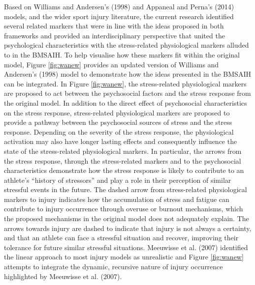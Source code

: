 \documentclass[
  english,
  man,floatsintext]{apa6}
\begin{document}
Based on Williams and Andersen's (1998) and Appaneal and Perna's (2014) models, and the wider sport injury literature, the current research identified several related markers that were in line with the ideas proposed in both frameworks and provided an interdisciplinary perspective that united the psychological characteristics with the stress-related physiological markers alluded to in the BMSAIH.
To help visualise how these markers fit within the original model, Figure \ref{fig:wanew} provides an updated version of Williams and Andersen's (1998) model to demonstrate how the ideas presented in the BMSAIH can be integrated.
In Figure \ref{fig:wanew}, the stress-related physiological markers are proposed to act between the psychosocial factors and the stress response from the original model.
In addition to the direct effect of psychosocial characteristics on the stress response, stress-related physiological markers are proposed to provide a pathway between the psychosocial sources of stress and the stress response.
Depending on the severity of the stress response, the physiological activation may also have longer lasting effects and consequently influence the state of the stress-related physiological markers.
In particular, the arrows from the stress response, through the stress-related markers and to the psychosocial characteristics demonstrate how the stress response is likely to contribute to an athlete's \enquote{history of stressors} and play a role in their perception of similar stressful events in the future.
The dashed arrow from stress-related physiological markers to injury indicates how the accumulation of stress and fatigue can contribute to injury occurrence through overuse or burnout mechanisms, which the proposed mechanisms in the original model does not adequately explain.
The arrows towards injury are dashed to indicate that injury is not always a certainty, and that an athlete can face a stressful situation and recover, improving their tolerance for future similar stressful situations.
Meeuwisse et al. (2007) identified the linear approach to most injury models as unrealistic and Figure \ref{fig:wanew} attempts to integrate the dynamic, recursive nature of injury occurrence highlighted by Meeuwisse et al. (2007).
\end{document}
